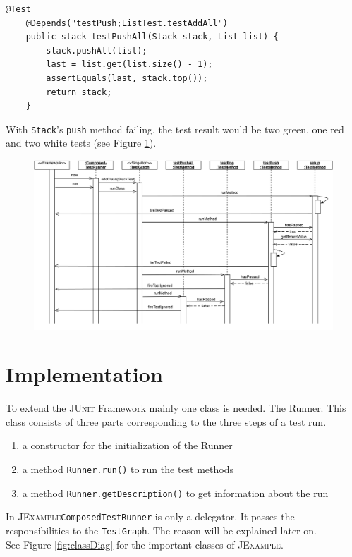 \documentclass[11pt,a4paper,pdftex]{article}
\newcommand{\JUnit}{\textsc{JUnit}\xspace}
\newcommand{\JExample}{\textsc{JExample}\xspace}
\newcommand{\ttt}[1]{\texttt{#1}}
\begin{document}
\begin{lstlisting}[label=lst:testpushall,caption=A test may have multiple dependencies.]
    @Test
    @Depends("testPush;ListTest.testAddAll")
    public stack testPushAll(Stack stack, List list) {
        stack.pushAll(list);
        last = list.get(list.size() - 1);
        assertEquals(last, stack.top());
        return stack;
    }
\end{lstlisting}

With \ttt{Stack}'s \ttt{push} method failing, the test result would be two green, one red and two white tests (see Figure \ref{fig:testPush}).

\begin{figure}[htbp]
 \includegraphics[width=15.0cm]{testPush.pdf}
 \caption{}
 \label{fig:testPush}
\end{figure}

\section{Implementation}

To extend the \JUnit Framework mainly one class is needed. The Runner. This class consists of three parts corresponding to the three steps of a test run.

\begin{enumerate}
 \item a constructor for the initialization of the Runner
 \item a method \verb|Runner.run()| to run the test methods
 \item a method \verb|Runner.getDescription()| to get information about the run
\end{enumerate}
In \JExample \verb|ComposedTestRunner| is only a delegator. It passes the responsibilities to the \verb|TestGraph|. The reason will be explained later on.\\
See Figure \ref{fig:classDiag} for the important classes of \JExample.
\end{document}
